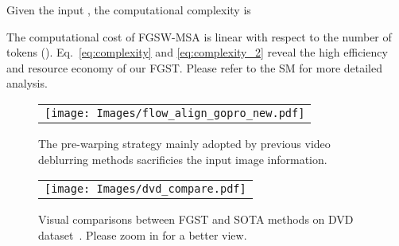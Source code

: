 \documentclass{article}
\begin{document}
	Given the input , the computational complexity is
\vspace{-0.5mm}
	
	The computational cost of FGSW-MSA is linear with respect to the number of tokens (). Eq.~\eqref{eq:complexity} and \eqref{eq:complexity_2} reveal the high efficiency and resource economy of our FGST. Please refer to the SM for more detailed analysis.
	
	\begin{figure}[h]
		\begin{center}
			\begin{tabular}[t]{c} \hspace{-3mm} 
				\texttt{[image: Images/flow\_align\_gopro\_new.pdf]}
			\end{tabular}
		\end{center}
		\vspace{-5mm}
		\caption{\small The pre-warping strategy mainly adopted by previous video deblurring methods  sacrificies the input image information.}
		\label{fig:pre_warping}
		\vspace{-3mm}
	\end{figure}
	
	\begin{figure*}[t]
		\begin{center}
			\begin{tabular}[t]{c} \hspace{-2mm}
				\texttt{[image: Images/dvd\_compare.pdf]}
			\end{tabular}
		\end{center}
		\vspace*{-5mm}
		\caption{\small Visual comparisons between FGST and SOTA methods on DVD dataset~\cite{Su}. Please zoom in for a better view.}
		\label{fig:dvd}
		\vspace{-3mm}
	\end{figure*}
	
\end{document}
